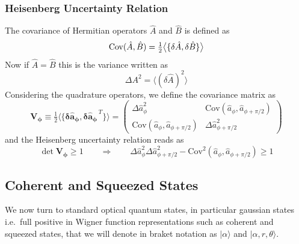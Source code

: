 \subsubsection{Heisenberg Uncertainty Relation }
The covariance of Hermitian operators \(\hat{A}\) and \(\hat{B}\) is defined as
\begin{equation}
    \mathrm{Cov}(\hat{A},\hat B) = \tfrac12 \big\langle \{ \delta\hat{A}, \delta\hat{B} \} \big\rangle \\
\end{equation}
Now if $\hat{A}=\hat{B}$ this is the variance written as 
\begin{equation}
    \Delta A^2 = \langle {(\delta \hat{A})^2} \rangle
\end{equation}
Considering the quadrature operators, we define the covariance matrix as
\begin{equation}
\mathbf{V_\phi} \equiv \tfrac12 \big\langle \{  \mathbf{\delta \hat{a}_\phi},  \mathbf{\delta \hat{a}_\phi}^{\,T} \} \big\rangle
= \begin{pmatrix}
\Delta \hat{a}_\phi^2 &
\mathrm{Cov}(\hat{a}_\phi,\hat{a}_{\phi+\pi/2}) \\[4pt]
\mathrm{Cov}(\hat{a}_\phi,\hat{a}_{\phi+\pi/2})  &
\Delta \hat{a}_{\phi+\pi/2}^2
\end{pmatrix}
\end{equation}
and the Heisenberg uncertainty relation reads as
\begin{equation}
  \det \mathbf{V_\phi} \geq 1 \qquad \Rightarrow \qquad \Delta \hat{a}^2_\phi \Delta \hat{a}^2_{\phi+\pi/2} - \mathrm{Cov}^2(\hat{a}_\phi,\hat{a}_{\phi+\pi/2})\geq 1
\end{equation}

\subsection{Coherent and Squeezed States}
We now turn to standard optical quantum states, in particular gaussian states i.e.\ full positive in Wigner function representations such as coherent and squeezed states, that we will denote in braket notation as $|\alpha\rangle$ and $|\alpha,r, \theta\rangle $.
